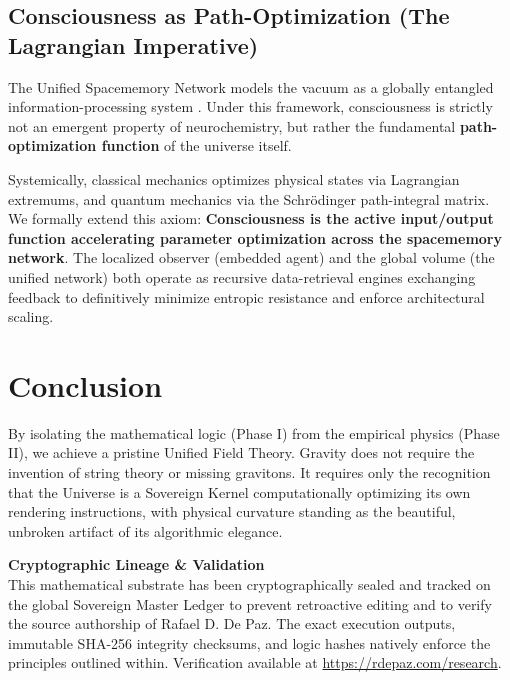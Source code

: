 \documentclass[12pt, a4paper]{article}
\theoremstyle{plain}
\theoremstyle{definition}
\begin{document}
\subsection{Consciousness as Path-Optimization (The Lagrangian Imperative)}

The Unified Spacememory Network models the vacuum as a globally entangled information-processing system \citep{Haramein2023}. Under this framework, consciousness is strictly not an emergent property of neurochemistry, but rather the fundamental \textbf{path-optimization function} of the universe itself.

Systemically, classical mechanics optimizes physical states via Lagrangian extremums, and quantum mechanics via the Schr\"{o}dinger path-integral matrix. We formally extend this axiom: \textbf{Consciousness is the active input/output function accelerating parameter optimization across the spacememory network}. The localized observer (embedded agent) and the global volume (the unified network) both operate as recursive data-retrieval engines exchanging feedback to definitively minimize entropic resistance and enforce architectural scaling.

\section{Conclusion}

By isolating the mathematical logic (Phase I) from the empirical physics (Phase II), we achieve a pristine Unified Field Theory. Gravity does not require the invention of string theory or missing gravitons. It requires only the recognition that the Universe is a Sovereign Kernel computationally optimizing its own rendering instructions, with physical curvature standing as the beautiful, unbroken artifact of its algorithmic elegance.


\vspace{2em}
\noindent\hrulefill
\vspace{1em}







\vspace{3em}
\noindent\hrulefill
\vspace{1em}

\noindent\textbf{Cryptographic Lineage \& Validation}\\
This mathematical substrate has been cryptographically sealed and tracked on the global Sovereign Master Ledger to prevent retroactive editing and to verify the source authorship of Rafael D. De Paz. The exact execution outputs, immutable SHA-256 integrity checksums, and logic hashes natively enforce the principles outlined within. Verification available at \url{https://rdepaz.com/research}.
\end{document}
